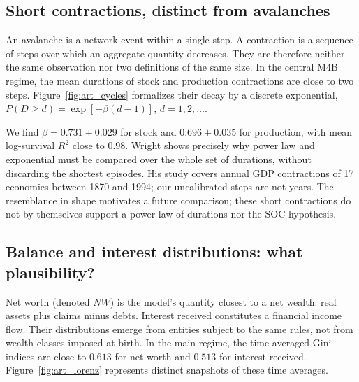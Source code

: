 \subsection{Short contractions, distinct from avalanches}
An avalanche is a network event within a single step. A contraction is
a sequence of steps over which an aggregate quantity decreases. They
are therefore neither the same observation nor two definitions of the
same size. In the central M4B regime, the mean durations of stock and
production contractions are close to two steps.
Figure~\ref{fig:art_cycles} formalizes their decay by a discrete
exponential, $P(D\ge d)=\exp[-\beta(d-1)]$, $d=1,2,\ldots$.


We find $\beta=0.731\pm0.029$ for stock and $0.696\pm0.035$ for
production, with mean log-survival $R^2$ close to $0.98$. Wright
\cite{wright} shows precisely why power law and exponential must be
compared over the whole set of durations, without discarding the
shortest episodes. His study covers annual GDP contractions of 17
economies between 1870 and 1994; our uncalibrated steps are not years.
The resemblance in shape motivates a future comparison; these short
contractions do not by themselves support a power law of durations nor
the SOC hypothesis.

\subsection{Balance and interest distributions: what plausibility?}
Net worth (denoted $NW$) is the model's quantity closest to a net
wealth: real assets plus claims minus debts. Interest received
constitutes a financial income flow. Their distributions emerge from
entities subject to the same rules, not from wealth classes imposed at
birth. In the main regime, the time-averaged Gini indices are close to
$0.613$ for net worth and $0.513$ for interest received.
Figure~\ref{fig:art_lorenz} represents distinct snapshots of these time
averages.

